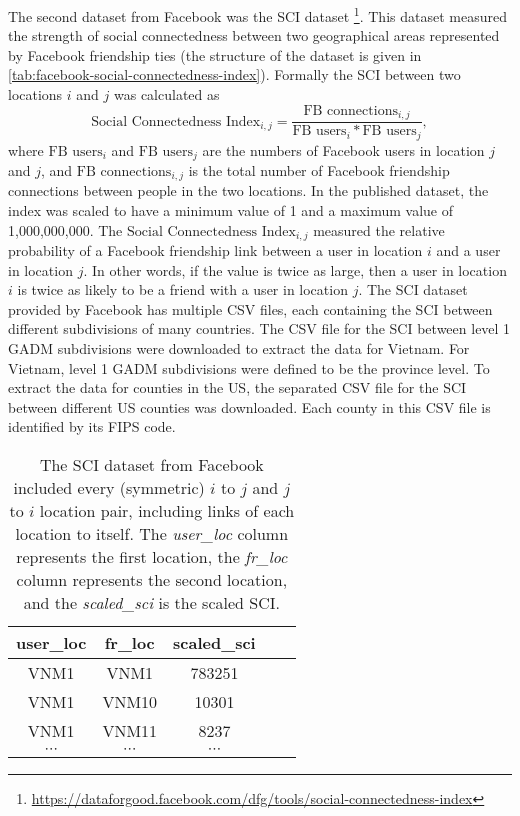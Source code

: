 The second dataset from Facebook was the \gls{SCI} dataset \footnote{\url{https://dataforgood.facebook.com/dfg/tools/social-connectedness-index}}.
This dataset measured the strength of social connectedness between two geographical areas represented by Facebook friendship ties (the structure of the dataset is given in \autoref{tab:facebook-social-connectedness-index}).
Formally the \gls{SCI} between two locations $i$ and $j$ was calculated as
\begin{equation*}
    \text{Social Connectedness Index}_{i,j} = \frac{\text{FB connections}_{i,j}}{\text{FB users}_i * \text{FB users}_j},
\end{equation*}
where $\text{FB users}_i$ and $\text{FB users}_j$ are the numbers of Facebook users in location $j$ and $j$, and $\text{FB connections}_{i,j}$ is the total number of Facebook friendship connections between people in the two locations.
In the published dataset, the index was scaled to have a minimum value of 1 and a maximum value of 1,000,000,000.
The $\text{Social Connectedness Index}_{i,j}$ measured the relative probability of a Facebook friendship link between a user in location $i$ and a user in location $j$.
In other words, if the value is twice as large, then a user in location $i$ is twice as likely to be a friend with a user in location $j$.
The \gls{SCI} dataset provided by Facebook has multiple \gls{CSV} files, each containing the \gls{SCI} between different subdivisions of many countries.
The \gls{CSV} file for the \gls{SCI} between level 1 \gls{GADM} subdivisions were downloaded to extract the data for Vietnam.
For Vietnam, level 1 \gls{GADM} subdivisions were defined to be the province level.
To extract the data for counties in the \gls{US}, the separated \gls{CSV} file for the \gls{SCI} between different \gls{US} counties was downloaded.
Each county in this \gls{CSV} file is identified by its \gls{FIPS} code.

\begin{table}[h]
\centering
\begin{tabular}{| c | c | c | c | c |}
    user\_loc & fr\_loc & scaled\_sci \\
    \hline\hline
    VNM1 & VNM1 & 783251 \\
    \hline
    VNM1 & VNM10 & 10301 \\
    \hline
    VNM1 & VNM11 & 8237 \\
    \hline
    $\cdots$ & $\cdots$ & $\cdots$ \\
\end{tabular}
\caption{The \gls{SCI} dataset from Facebook included every (symmetric) $i$ to $j$ and $j$ to $i$ location pair, including links of each location to itself. The \textit{user\_loc} column represents the first location, the \textit{fr\_loc} column represents the second location, and the \textit{scaled\_sci} is the scaled \gls{SCI}.}
\label{tab:facebook-social-connectedness-index}
\end{table}

